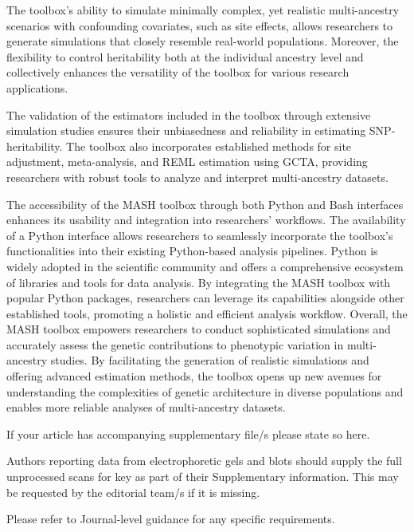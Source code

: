 \documentclass[sn-nature]{sn-jnl}%
\begin{document}
The toolbox's ability to simulate minimally complex, yet realistic multi-ancestry scenarios with confounding covariates, such as site effects, allows researchers to generate simulations that closely resemble real-world populations. Moreover, the flexibility to control heritability both at the individual ancestry level and collectively enhances the versatility of the toolbox for various research applications.

The validation of the estimators included in the toolbox through extensive simulation studies ensures their unbiasedness and reliability in estimating SNP-heritability. The toolbox also incorporates established methods for site adjustment, meta-analysis, and REML estimation using GCTA, providing researchers with robust tools to analyze and interpret multi-ancestry datasets.

The accessibility of the MASH toolbox through both Python and Bash interfaces enhances its usability and integration into researchers' workflows. The availability of a Python interface allows researchers to seamlessly incorporate the toolbox's functionalities into their existing Python-based analysis pipelines. Python is widely adopted in the scientific community and offers a comprehensive ecosystem of libraries and tools for data analysis. By integrating the MASH toolbox with popular Python packages, researchers can leverage its capabilities alongside other established tools, promoting a holistic and efficient analysis workflow.
Overall, the MASH toolbox empowers researchers to conduct sophisticated simulations and accurately assess the genetic contributions to phenotypic variation in multi-ancestry studies. By facilitating the generation of realistic simulations and offering advanced estimation methods, the toolbox opens up new avenues for understanding the complexities of genetic architecture in diverse populations and enables more reliable analyses of multi-ancestry datasets.

\backmatter


If your article has accompanying supplementary file/s please state so here. 

Authors reporting data from electrophoretic gels and blots should supply the full unprocessed scans for key as part of their Supplementary information. This may be requested by the editorial team/s if it is missing.

Please refer to Journal-level guidance for any specific requirements.
\end{document}
